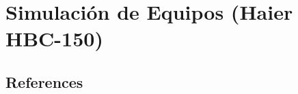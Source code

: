 \documentclass[
  spanish,
  letterpaper,
  DIV=11,
  numbers=noendperiod]{scrreprt}
\begin{document}
\part{Simulación de Equipos (Haier HBC-150)}

\chapter{}\label{section-4}

\chapter{}\label{section-5}


\chapter{}\label{section-6}


\chapter*{References}\label{references}


\label{refs}
\end{document}
